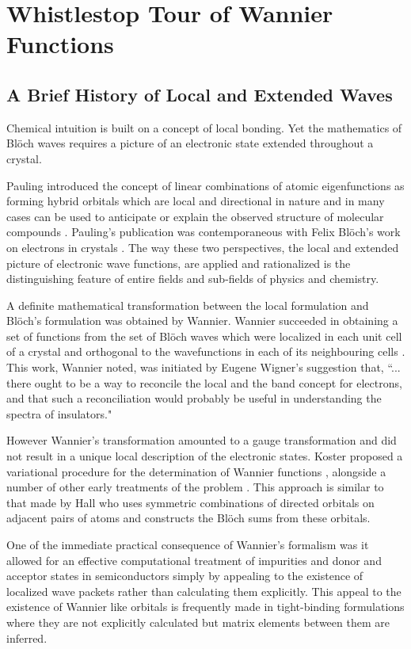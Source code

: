 \chapter{Whistlestop Tour of Wannier Functions}
\label{chap:wannier}
\section{A Brief History of Local and Extended Waves}
Chemical intuition is built on a concept of local bonding. 
Yet the mathematics of Bl\"och waves requires a picture of an 
electronic state extended throughout a crystal.

Pauling introduced the concept of linear combinations of atomic eigenfunctions
as forming hybrid orbitals which are local and directional in nature and
in many cases can be used to anticipate or explain the observed structure
of molecular compounds \cite{pauling28}. Pauling's publication was contemporaneous
with Felix Bl\"och's work on electrons in crystals \cite{bloch29}. The
way these two perspectives, the local and extended picture of electronic wave functions, 
are applied and rationalized is the distinguishing feature 
of entire fields and sub-fields of physics and chemistry.

A definite mathematical transformation between the local formulation
and Bl\"och's formulation was obtained by Wannier. 
Wannier succeeded in obtaining a set of functions
from the set of Bl\"och waves which were localized in each unit cell
of a crystal and orthogonal to the wavefunctions in each of its
neighbouring cells \cite{wannier37, wannier62}. 
This work, Wannier noted, was initiated by Eugene Wigner's suggestion that, 
``... there ought to be a way to reconcile the local and the band concept 
for electrons, and that such a reconciliation would probably be useful in 
understanding the spectra of insulators." 


However Wannier's transformation amounted to a gauge transformation
and did not result in a unique local description of the electronic states.
Koster proposed a variational procedure for the determination 
of Wannier functions \cite{koster53},
alongside a number of other early treatments of the problem \cite{winston54}.
This approach is similar to that made by Hall \cite{hall52} who uses symmetric  
combinations of directed orbitals on adjacent pairs of atoms and constructs 
the Bl\"och sums from these orbitals.

One of the immediate practical consequence of Wannier's formalism was
it allowed for an effective computational treatment of impurities 
and donor and acceptor states in semiconductors \cite{slater49,kittel54} simply
by appealing to the existence of localized wave packets rather than calculating
them explicitly. This appeal to the existence of Wannier like orbitals is frequently made in
tight-binding formulations where they are not explicitly calculated but
matrix elements between them are inferred.

